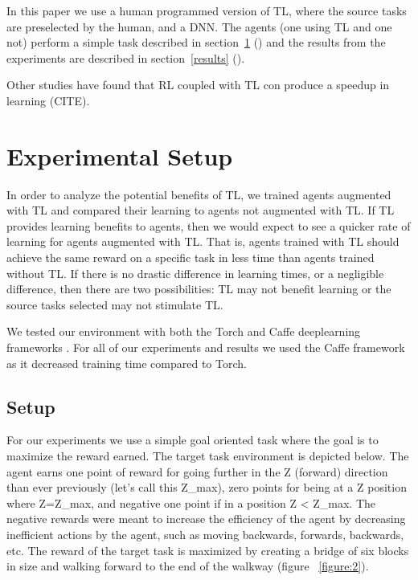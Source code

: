 \documentclass{article}
\newcommand{\sectlabel}[1]{section~\ref{#1} (\nameref{#1})}
\begin{document}
In this paper we use a human programmed version of TL, where the source tasks are preselected by the human, and a DNN.
The agents (one using TL and one not) perform a simple task described in \sectlabel{experimentalSetup} and the results from the experiments are described in \sectlabel{results}.

Other studies have found that RL coupled with TL con produce a speedup in learning (CITE).


\section{Experimental Setup}\label{experimentalSetup}


In order to analyze the potential benefits of TL, we trained agents augmented with TL and compared their learning to agents not augmented with TL. 
If TL provides learning benefits to agents, then we would expect to see a quicker rate of learning for agents augmented with TL.
That is, agents trained with TL should achieve the same reward on a specific task in less time than agents trained without TL. 
If there is no drastic difference in learning times, or a negligible difference, then there are two possibilities: TL may not benefit learning or the source tasks selected may not stimulate TL. 

We tested our environment with both the Torch and Caffe deeplearning frameworks \citep{collobert2011torch7,jia2014caffe}. For all of our experiments and results we used the Caffe framework as it decreased training time compared to Torch. 

\subsection{Setup}

For our experiments we use a simple goal oriented task where the goal is to maximize the reward earned. 
The target task environment is depicted below.
The agent earns one point of reward for going further in the Z (forward) direction than ever previously (let's call this Z\_max), zero points for being at a Z position where Z=Z\_max, and negative one point if in a position Z < Z\_max.
The negative rewards were meant to increase the efficiency of the agent by decreasing inefficient actions by the agent, such as moving backwards, forwards, backwards, etc. 
The reward of the target task is maximized by creating a bridge of six blocks in size and walking forward to the end of the walkway (figure ~\ref{figure:2}). 
\end{document}
